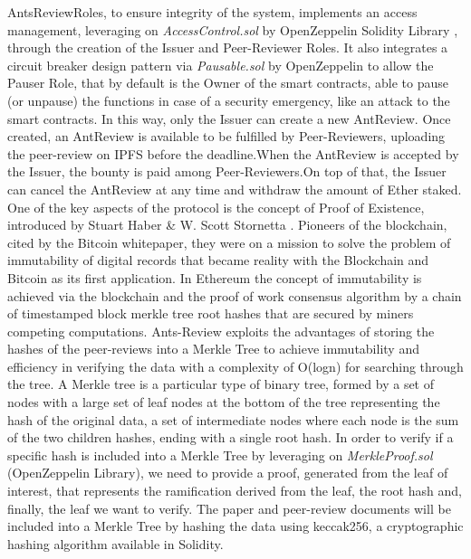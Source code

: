 \documentclass[runningheads]{llncs}
\begin{document}
AntsReviewRoles, to ensure integrity of the system, implements an access management, leveraging on \emph{AccessControl.sol} by OpenZeppelin Solidity Library \cite{OZ}, through the creation of the Issuer and Peer-Reviewer Roles.
\newline It also integrates a circuit breaker design pattern via \emph{Pausable.sol} by OpenZeppelin to allow the Pauser Role, that by default is the Owner of the smart contracts, able to pause (or unpause) the functions in case of a security emergency, like an attack to the smart contracts. In this way, only the Issuer can create a new AntReview.
\newline Once created, an AntReview is available to be fulfilled by Peer-Reviewers, uploading the peer-review on IPFS before the deadline.When the AntReview is accepted by the Issuer, the bounty is paid among Peer-Reviewers.On top of that, the Issuer can cancel the AntReview at any time and withdraw the amount of Ether staked.
\newline One of the key aspects of the protocol is the concept of Proof of Existence, introduced by Stuart Haber \& W. Scott Stornetta \cite{TimeStamp-Haber}. Pioneers of the blockchain, cited by the Bitcoin whitepaper\cite{Bitcoin}, they were on a mission to solve the problem of immutability of digital records that became reality with the Blockchain and Bitcoin as its first application. In Ethereum \cite{Ethereum} the concept of immutability is achieved via the blockchain and the proof of work consensus algorithm by a chain of timestamped block merkle tree root hashes that are secured by miners competing computations.
\newline Ants-Review exploits the advantages of storing the hashes of the peer-reviews into a Merkle Tree \cite{BayerHaber1992} to achieve immutability and efficiency in verifying the data with a complexity of O(logn) for searching through the tree.
\newline A Merkle tree is a particular type of binary tree, formed by a set of nodes with a large set of leaf nodes at the bottom of the tree representing the hash of the original data, a set of intermediate nodes where each node is the sum of the two children hashes, ending with a single root hash. In order to verify if a specific hash is included into a Merkle Tree by leveraging on \emph{MerkleProof.sol} (OpenZeppelin Library), we need to provide a proof, generated from the leaf of interest, that represents the ramification derived from the leaf, the root hash and, finally, the leaf we want to verify.
\newline The paper and peer-review documents will be included into a Merkle Tree by hashing the data using keccak256, a cryptographic hashing algorithm available in Solidity.
\end{document}
